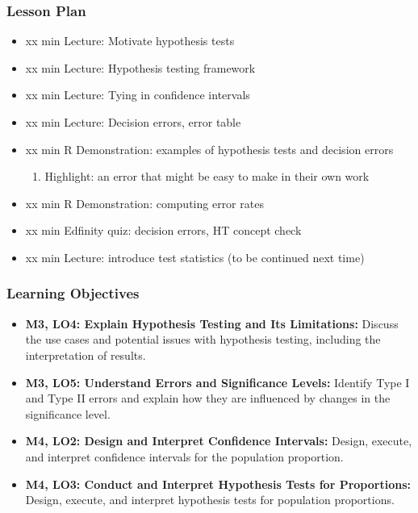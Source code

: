\begin{frame}
    \frametitle{Lesson Plan}
    \begin{itemize}
        \item xx min Lecture: Motivate hypothesis tests
        \item xx min Lecture: Hypothesis testing framework
        \item xx min Lecture: Tying in confidence intervals
        \item xx min Lecture: Decision errors, error table
        \item xx min R Demonstration: examples of hypothesis tests and decision errors
        \begin{enumerate}
            \item Highlight: an error that might be easy to make in their own work
        \end{enumerate}
        \item xx min R Demonstration: computing error rates
        \item xx min Edfinity quiz: decision errors, HT concept check
        \item xx min Lecture: introduce test statistics (to be continued next time)
    \end{itemize}
\end{frame}
            
\begin{frame}
    \frametitle{Learning Objectives}
    \begin{itemize}
        \item \textbf{M3, LO4: Explain Hypothesis Testing and Its Limitations:} Discuss the use cases and potential issues with hypothesis testing, including the interpretation of results.
        \item \textbf{M3, LO5: Understand Errors and Significance Levels:} Identify Type I and Type II errors and explain how they are influenced by changes in the significance level.
        \item \textbf{M4, LO2: Design and Interpret Confidence Intervals:} Design, execute, and interpret confidence intervals for the population proportion.
        \item \textbf{M4, LO3: Conduct and Interpret Hypothesis Tests for Proportions:} Design, execute, and interpret hypothesis tests for population proportions.
    \end{itemize}
\end{frame}
    

    